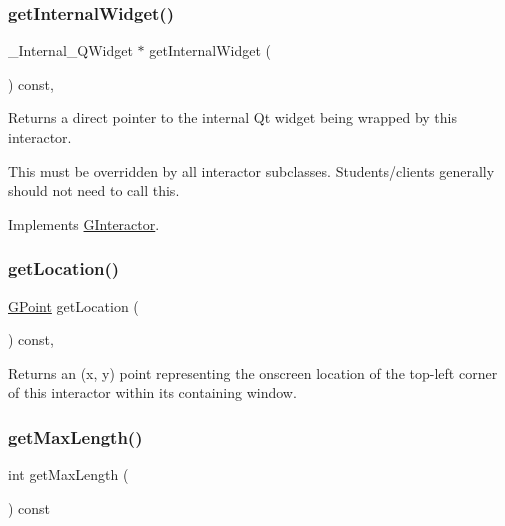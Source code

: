 \subsubsection{\texorpdfstring{get\+Internal\+Widget()}{getInternalWidget()}}
{\footnotesize\ttfamily \+\_\+\+Internal\+\_\+\+Q\+Widget $\ast$ get\+Internal\+Widget (\begin{DoxyParamCaption}{ }\end{DoxyParamCaption}) const\hspace{0.3cm}{\ttfamily [override]}, {\ttfamily [virtual]}}



Returns a direct pointer to the internal Qt widget being wrapped by this interactor. 

This must be overridden by all interactor subclasses. Students/clients generally should not need to call this. 

Implements \mbox{\hyperlink{classGInteractor}{G\+Interactor}}.

\mbox{\label{classGInteractor_a4f83802015511edeb63b892830812c11}} 
\subsubsection{\texorpdfstring{get\+Location()}{getLocation()}}
{\footnotesize\ttfamily \mbox{\hyperlink{structGPoint}{G\+Point}} get\+Location (\begin{DoxyParamCaption}{ }\end{DoxyParamCaption}) const\hspace{0.3cm}{\ttfamily [virtual]}, {\ttfamily [inherited]}}



Returns an (x, y) point representing the onscreen location of the top-\/left corner of this interactor within its containing window. 

\mbox{\label{classGTextField_a465e41b66da9e75443bf0b7951582468}} 
\subsubsection{\texorpdfstring{get\+Max\+Length()}{getMaxLength()}}
{\footnotesize\ttfamily int get\+Max\+Length (\begin{DoxyParamCaption}{ }\end{DoxyParamCaption}) const\hspace{0.3cm}{\ttfamily [virtual]}}



